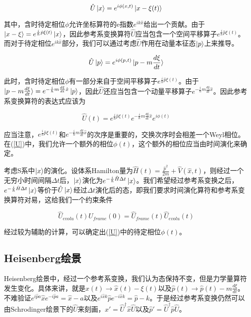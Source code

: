 \documentclass[a4paper]{article}
\begin{document}
    \begin{equation}
        \hat{U}\ket{x}=e^{i\phi(x,t)}\ket{x-\xi(t)}
    \end{equation}

    其中，含时待定相位$\phi$允许坐标算符的e指数$e^{ik\hat{x}}$给出一个贡献。由于$\ket{x-\xi}=e^{\frac{i}{\hbar}\hat{p}\xi(t)}\ket{x}$，因此参考系变换算符$\hat{U}$应当包含一个空间平移算子$e^{\frac{i}{\hbar}\hat{p}\xi(t)}$。而对于待定相位$e^{ik\hat{x}}$部分，我们可以通过考虑$\hat{U}$作用在动量本征态$\ket{p}$上来推导。

    \begin{equation}
        \hat{U}\ket{p}=e^{i\phi(p,t)}\ket{p-m\frac{d\xi}{dt}}
    \end{equation}

    此时，含时待定相位$\phi$有一部分来自于空间平移算子$e^{\frac{i}{\hbar}\hat{p}\xi(t)}$。由于$\ket{p-m\frac{d\xi}{dt}}=e^{-\frac{i}{\hbar}m\frac{d\xi}{dt}\hat{x}}\ket{p}$，因此$\hat{U}$还应当包含一个动量平移算子$e^{-\frac{i}{\hbar}m\frac{d\xi}{dt}\hat{x}}$。因此参考系变换算符的表达式应该为

    \begin{equation}\label{U}
        \hat{U}(t)=e^{\frac{i}{\hbar}\hat{p}\xi(t)}e^{-\frac{i}{\hbar}m\frac{d\xi}{dt}\hat{x}}e^{i\phi(t)}
    \end{equation}

    应当注意，$e^{\frac{i}{\hbar}\hat{p}\xi(t)}$和$e^{-\frac{i}{\hbar}m\frac{d\xi}{dt}\hat{x}}$的次序是重要的，交换次序时会相差一个Weyl相位。在(\ref{U})中，我们允许一个额外的相位$\phi(t)$，这个额外的相位应当由时间演化来确定。

    考虑S系中$\ket{x}$的演化。设体系Hamilton量为$\hat{H}(t)=\frac{\hat{p}^2}{2m}+\hat{V}(\hat{x},t)$，则经过一个无穷小时间间隔$\Delta t$后，$\ket{x}$演化为$e^{-\frac{i}{\hbar}\hat{H}\Delta t}\ket{x}$。我们希望经过参考系变换之后，$e^{-\frac{i}{\hbar}\hat{H}\Delta t}\ket{x}$等价于$\hat{U}\ket{x}$经过$\Delta t$演化后的态，即我们要求时间演化算符和参考系变换算符对易，这给我们一个约束条件

    \begin{equation}
        \hat{U}_{evolu}(t)\hat{U}_{frame}(0)=\hat{U}_{frame}(t)\hat{U}_{evolu}(t)
    \end{equation}

    经过较为辅助的计算，可以确定出(\ref{U})中的待定相位$\phi(t)$。

\subsection{Heisenberg绘景}
    Heisenberg绘景中，经过一个参考系变换，我们认为态保持不变，但是力学量算符发生变化。具体来讲，就是$\hat{x}(t)\to\hat{x}(t)-\xi(t)$以及$\hat{p}(t)\to\hat{p}(t)-m\frac{d\xi}{dt}$。不难验证$e^{i\hat{p}a}\hat{x}e^{-i\hat{p}a}=\hat{x}-a$以及$e^{i\hat{x}k}\hat{p}e^{-i\hat{x}k}=\hat{p}-k$。于是经过参考系变换仍然可以由Schrodinger绘景下的$\hat{U}$来刻画，$\hat{x}'=\hat{U}^\dagger\hat{x}\hat{U}$以及$\hat{p}'=\hat{U}^\dagger\hat{p}\hat{U}$。
\end{document}

